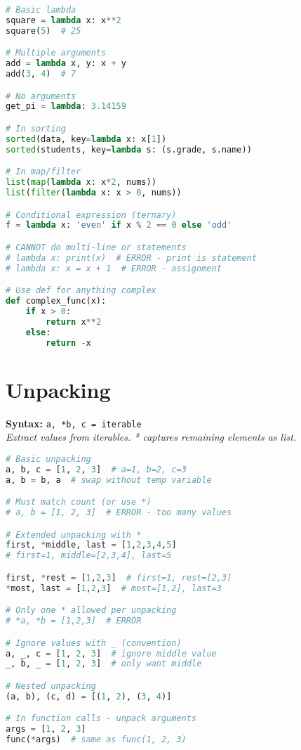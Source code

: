 \documentclass[8pt,landscape]{article}
\begin{document}
\begin{multicols}{3}
\begin{lstlisting}[language=Python]
# Basic lambda
square = lambda x: x**2
square(5)  # 25

# Multiple arguments
add = lambda x, y: x + y
add(3, 4)  # 7

# No arguments
get_pi = lambda: 3.14159

# In sorting
sorted(data, key=lambda x: x[1])
sorted(students, key=lambda s: (s.grade, s.name))

# In map/filter
list(map(lambda x: x*2, nums))
list(filter(lambda x: x > 0, nums))

# Conditional expression (ternary)
f = lambda x: 'even' if x % 2 == 0 else 'odd'

# CANNOT do multi-line or statements
# lambda x: print(x)  # ERROR - print is statement
# lambda x: x = x + 1  # ERROR - assignment

# Use def for anything complex
def complex_func(x):
    if x > 0:
        return x**2
    else:
        return -x
\end{lstlisting}

\section*{Unpacking}
\textbf{Syntax:} \lstinline|a, *b, c = iterable| \\
\textit{Extract values from iterables. * captures remaining elements as list.}

\begin{lstlisting}[language=Python]
# Basic unpacking
a, b, c = [1, 2, 3]  # a=1, b=2, c=3
a, b = b, a  # swap without temp variable

# Must match count (or use *)
# a, b = [1, 2, 3]  # ERROR - too many values

# Extended unpacking with *
first, *middle, last = [1,2,3,4,5]
# first=1, middle=[2,3,4], last=5

first, *rest = [1,2,3]  # first=1, rest=[2,3]
*most, last = [1,2,3]  # most=[1,2], last=3

# Only one * allowed per unpacking
# *a, *b = [1,2,3]  # ERROR

# Ignore values with _ (convention)
a, _, c = [1, 2, 3]  # ignore middle value
_, b, _ = [1, 2, 3]  # only want middle

# Nested unpacking
(a, b), (c, d) = [(1, 2), (3, 4)]

# In function calls - unpack arguments
args = [1, 2, 3]
func(*args)  # same as func(1, 2, 3)


\end{lstlisting}
\end{multicols}
\end{document}
